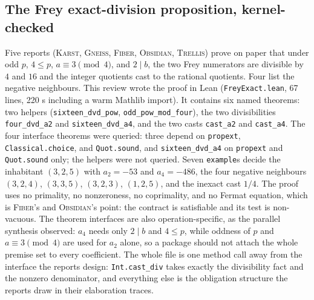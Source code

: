 \documentclass[11pt,a4paper]{article}
\newcommand{\code}[1]{\nolinkurl{#1}}
\newcommand{\Fb}{\textsc{Fiber}}
\newcommand{\Gn}{\textsc{Gneiss}}
\newcommand{\Ks}{\textsc{Karst}}
\newcommand{\Ob}{\textsc{Obsidian}}
\newcommand{\Tr}{\textsc{Trellis}}
\theoremstyle{definition}
\begin{document}
\subsection{The Frey exact-division proposition, kernel-checked}\label{sec:frey}
Five reports (\Ks, \Gn, \Fb, \Ob, \Tr) prove on paper that under odd $p$, $4\le p$, $a\equiv3\pmod4$, and $2\mid b$, the two Frey numerators are divisible by $4$ and $16$ and the integer quotients cast to the rational quotients. Four list the negative neighbours. This review wrote the proof in Lean (\code{FreyExact.lean}, 67 lines, 220 s including a warm Mathlib import). It contains six named theorems: two helpers (\code{sixteen_dvd_pow}, \code{odd_pow_mod_four}), the two divisibilities \code{four_dvd_a2} and \code{sixteen_dvd_a4}, and the two casts \code{cast_a2} and \code{cast_a4}. The four interface theorems were queried: three depend on \code{propext}, \code{Classical.choice}, and \code{Quot.sound}, and \code{sixteen_dvd_a4} on \code{propext} and \code{Quot.sound} only; the helpers were not queried. Seven \code{example}s decide the inhabitant $(3,2,5)$ with $a_2=-53$ and $a_4=-486$, the four negative neighbours $(3,2,4)$, $(3,3,5)$, $(3,2,3)$, $(1,2,5)$, and the inexact cast $1/4$. The proof uses no primality, no nonzeroness, no coprimality, and no Fermat equation, which is \Fb's and \Ob's point: the contract is satisfiable and its test is non-vacuous. The theorem interfaces are also operation-specific, as the parallel synthesis observed: $a_4$ needs only $2\mid b$ and $4\le p$, while oddness of $p$ and $a\equiv3\pmod4$ are used for $a_2$ alone, so a package should not attach the whole premise set to every coefficient. The whole file is one method call away from the interface the reports design: \code{Int.cast_div} takes exactly the divisibility fact and the nonzero denominator, and everything else is the obligation structure the reports draw in their elaboration traces.
\end{document}
